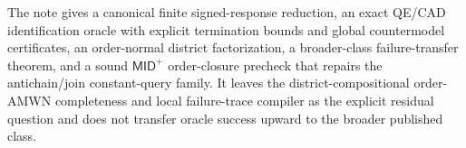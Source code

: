 The note gives a canonical finite signed-response reduction, an exact QE/CAD identification oracle with explicit termination bounds and global countermodel certificates, an order-normal district factorization, a broader-class failure-transfer theorem, and a sound \(\mathsf{MID}^{+}\) order-closure precheck that repairs the antichain/join constant-query family.  It leaves the district-compositional order-AMWN completeness and local failure-trace compiler as the explicit residual question and does not transfer oracle success upward to the broader published class.